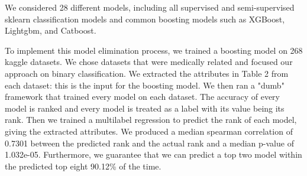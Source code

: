 \documentclass{article}
\begin{document}
We considered 28 different models, including all supervised and semi-supervised sklearn classification models and common boosting models such as XGBoost, Lightgbm, and Catboost.

To implement this model elimination process, we trained a boosting model on 268 kaggle datasets. We chose datasets that were medically related and focused our approach on binary classification. We extracted the attributes in Table 2 from each dataset: this is the input for the boosting model. We then ran a "dumb" framework that trained every model on each dataset. The accuracy of every model is ranked and every model is treated as a label with its value being its rank. Then we trained a multilabel regression to predict the rank of each model, giving the extracted attributes. We produced a median spearman correlation of 0.7301 between the predicted rank and the actual rank and a median p-value of 1.032e-05. Furthermore, we guarantee that we can predict a top two model within the predicted top eight 90.12\% of the time.
\end{document}
